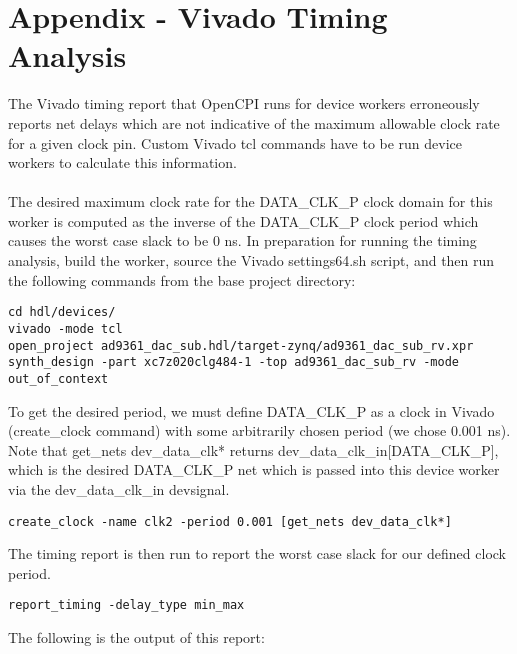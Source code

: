 \documentclass{article}
\begin{document}
\section{Appendix - Vivado Timing Analysis} \label{appendix}
The Vivado timing report that OpenCPI runs for device workers erroneously reports net delays which are not indicative of the maximum allowable clock rate for a given clock pin. Custom Vivado tcl commands have to be run device workers to calculate this information. \\ \\
The desired maximum clock rate for the DATA\_CLK\_P clock domain for this worker is computed as the inverse of the DATA\_CLK\_P clock period which causes the worst case slack to be 0 ns. In preparation for running the timing analysis, build the worker, source the Vivado settings64.sh script, and then run the following commands from the base project directory:
\lstset{language=bash, columns=flexible, breaklines=true, prebreak=\textbackslash, basicstyle=\ttfamily, showstringspaces=false,upquote=true, aboveskip=\baselineskip, belowskip=\baselineskip, upquote=true}
\begin{lstlisting}
cd hdl/devices/
vivado -mode tcl
open_project ad9361_dac_sub.hdl/target-zynq/ad9361_dac_sub_rv.xpr
synth_design -part xc7z020clg484-1 -top ad9361_dac_sub_rv -mode out_of_context
\end{lstlisting}
To get the desired period, we must define DATA\_CLK\_P as a clock in Vivado (create\_clock command) with some arbitrarily chosen period (we chose 0.001 ns). Note that get\_nets dev\_data\_clk* returns dev\_data\_clk\_in[DATA\_CLK\_P], which is the desired DATA\_CLK\_P net which is passed into this device worker via the dev\_data\_clk\_in devsignal.
\begin{lstlisting}
create_clock -name clk2 -period 0.001 [get_nets dev_data_clk*]
\end{lstlisting}
The timing report is then run to report the worst case slack for our defined clock period.
\begin{lstlisting}
report_timing -delay_type min_max
\end{lstlisting}
The following is the output of this report:
\fontsize{6}{12}\selectfont
\end{document}
